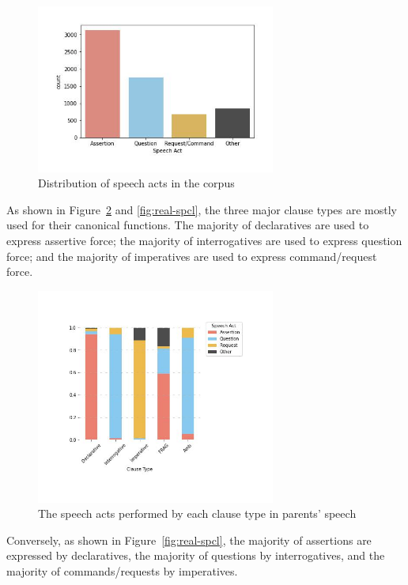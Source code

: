 \begin{figure}[H]
    \centering
    \includegraphics[width=0.7\textwidth]{figures/real-sp.jpg}
    \caption{Distribution of speech acts in the corpus}
    \label{fig:real-sp}
\end{figure}

As shown in Figure~\ref{fig:real-clsp} and \ref{fig:real-spcl}, the three major clause types are mostly used for their canonical functions. The majority of declaratives are used to express assertive force; the majority of interrogatives are used to express question force; and the majority of imperatives are used to express command/request force. 

\begin{figure}[H]
    \centering
    \includegraphics[width=0.7\textwidth]{figures/real-clsp.jpg}
    \caption{The speech acts performed by each clause type in parents' speech}
    \label{fig:real-clsp}
\end{figure}

Conversely, as shown in Figure~\ref{fig:real-spcl}, the majority of assertions are expressed by declaratives, the majority of questions by interrogatives, and the majority of commands/requests by imperatives.

